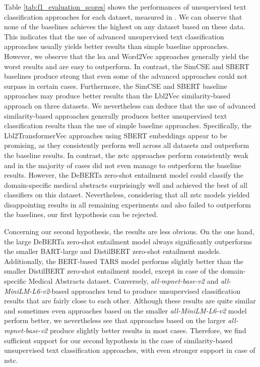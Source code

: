 \documentclass[sigconf]{acmart}
\begin{document}
Table \ref{tab:f1_evaluation_scores} shows the performances of unsupervised text classification approaches for each dataset, measured in . We can observe that none of the baselines achieves the highest  on any dataset based on these data. This indicates that the use of advanced unsupervised text classification approaches usually yields better results than simple baseline approaches. However, we observe that the \ac{lsa} and Word2Vec approaches generally yield the worst results and are easy to outperform. In contrast, the SimCSE and SBERT baselines produce strong  that even some of the advanced approaches could not surpass in certain cases. Furthermore, the SimCSE and SBERT baseline approaches may produce better results than the Lbl2Vec similarity-based approach on three datasets. We nevertheless can deduce that the use of advanced similarity-based approaches generally produces better unsupervised text classification results than the use of simple baseline approaches. Specifically, the Lbl2TransformerVec approaches using SBERT embeddings appear to be promising, as they consistently perform well across all datasets and outperform the baseline results. In contrast, the \ac{zstc} approaches perform consistently weak and in the majority of cases did not even manage to outperform the baseline results. However, the DeBERTa zero-shot entailment model could classify the domain-specific medical abstracts surprisingly well and achieved the best  of all classifiers on this dataset. Nevertheless, considering that all \ac{zstc} models yielded disappointing results in all remaining experiments and also failed to outperform the baselines, our first hypothesis can be rejected. 


Concerning our second hypothesis, the results are less obvious. On the one hand, the large DeBERTa zero-shot entailment model always significantly outperforms the smaller BART-large and DistilBERT zero-shot entailment models. Additionally, the BERT-based TARS model performs slightly better than the smaller DistilBERT zero-shot entailment model, except in case of the domain-specific Medical Abstracts dataset. Conversely, \textit{all-mpnet-base-v2} and \textit{all-MiniLM-L6-v2}-based approaches tend to produce unsupervised classification results that are fairly close to each other. Although these results are quite similar and sometimes even approaches based on the smaller \textit{all-MiniLM-L6-v2} model perform better, we nevertheless see that approaches based on the larger \textit{all-mpnet-base-v2} produce slightly better results in most cases. Therefore, we find sufficient support for our second hypothesis in the case of similarity-based unsupervised text classification approaches, with even stronger support in case of \ac{zstc}.
\end{document}
